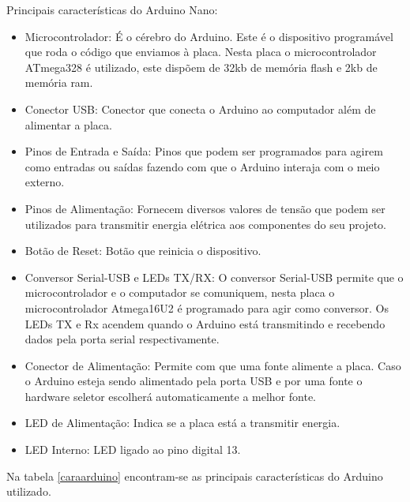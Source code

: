 Principais características do Arduino Nano: 

\begin{itemize}
	\item Microcontrolador: É o cérebro do Arduino. Este é o dispositivo programável que roda o código que enviamos à placa. Nesta placa o microcontrolador ATmega328 é utilizado, este dispõem de 32kb de memória flash e 2kb de memória ram.
	
	\item  Conector USB: Conector que conecta o Arduino ao computador além de alimentar a placa.
	
	\item  Pinos de Entrada e Saída: Pinos que podem ser programados para agirem como entradas ou saídas fazendo com que o Arduino interaja com o meio externo.
	
	\item Pinos de Alimentação: Fornecem diversos valores de tensão que podem ser utilizados para transmitir energia elétrica aos componentes do seu projeto.
	\item  Botão de Reset: Botão que reinicia o dispositivo.
	\item  Conversor Serial-USB e LEDs TX/RX: O conversor Serial-USB permite que o microcontrolador e o computador se comuniquem, nesta placa o microcontrolador Atmega16U2 é programado para agir como conversor. Os LEDs TX e Rx acendem quando o Arduino está transmitindo e recebendo dados pela porta serial respectivamente.
	\item  Conector de Alimentação: Permite com que uma fonte alimente a placa. Caso o Arduino esteja sendo alimentado pela porta USB e por uma fonte o hardware seletor escolherá automaticamente a melhor fonte.
	\item LED de Alimentação: Indica se a placa está a transmitir energia.
	\item LED Interno: LED ligado ao pino digital 13.
	
	
	
\end{itemize}



Na tabela \ref{caraarduino} encontram-se as principais características do Arduino utilizado. 


